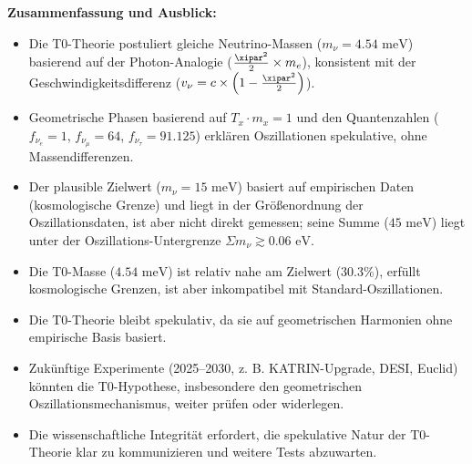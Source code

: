 	\begin{important}
		\textbf{Zusammenfassung und Ausblick:}
		\begin{itemize}
			\item Die T0-Theorie postuliert gleiche Neutrino-Massen (\(m_\nu = 4.54 \text{ meV}\)) basierend auf der Photon-Analogie (\(\frac{\xipar^2}{2} \times m_e\)), konsistent mit der Geschwindigkeitsdifferenz (\(v_\nu = c \times \left(1 - \frac{\xipar^2}{2}\right)\)).
			\item Geometrische Phasen basierend auf \(T_x \cdot m_x = 1\) und den Quantenzahlen (\(f_{\nu_e} = 1\), \(f_{\nu_\mu} = 64\), \(f_{\nu_\tau} = 91.125\)) erklären Oszillationen spekulative, ohne Massendifferenzen.
			\item Der plausible Zielwert (\(m_\nu = 15 \text{ meV}\)) basiert auf empirischen Daten (kosmologische Grenze) und liegt in der Größenordnung der Oszillationsdaten, ist aber nicht direkt gemessen; seine Summe (\(45 \text{ meV}\)) liegt unter der Oszillations-Untergrenze \(\Sigma m_\nu \gtrsim 0.06 \text{ eV}\).
			\item Die T0-Masse (\(4.54 \text{ meV}\)) ist relativ nahe am Zielwert (\(30.3\%\)), erfüllt kosmologische Grenzen, ist aber inkompatibel mit Standard-Oszillationen.
			\item Die T0-Theorie bleibt spekulativ, da sie auf geometrischen Harmonien ohne empirische Basis basiert.
			\item Zukünftige Experimente (2025–2030, z. B. KATRIN-Upgrade, DESI, Euclid) könnten die T0-Hypothese, insbesondere den geometrischen Oszillationsmechanismus, weiter prüfen oder widerlegen.
			\item Die wissenschaftliche Integrität erfordert, die spekulative Natur der T0-Theorie klar zu kommunizieren und weitere Tests abzuwarten.
		\end{itemize}
	\end{important}
	